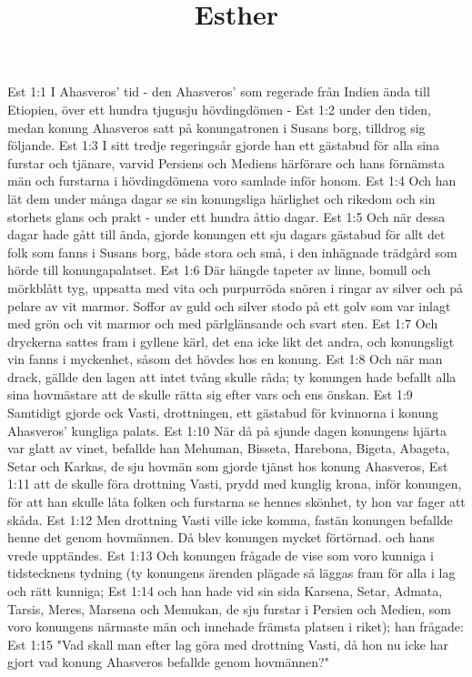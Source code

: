 

\title{Esther}

Est 1:1  I Ahasveros' tid - den Ahasveros' som regerade från Indien ända till Etiopien, över ett hundra tjugusju hövdingdömen -
Est 1:2  under den tiden, medan konung Ahasveros satt på konungatronen i Susans borg, tilldrog sig följande.
Est 1:3  I sitt tredje regeringsår gjorde han ett gästabud för alla sina furstar och tjänare, varvid Persiens och Mediens härförare och hans förnämsta män och furstarna i hövdingdömena voro samlade inför honom.
Est 1:4  Och han lät dem under många dagar se sin konungsliga härlighet och rikedom och sin storhets glans och prakt - under ett hundra åttio dagar.
Est 1:5  Och när dessa dagar hade gått till ända, gjorde konungen ett sju dagars gästabud för allt det folk som fanns i Susans borg, både stora och små, i den inhägnade trädgård som hörde till konungapalatset.
Est 1:6  Där hängde tapeter av linne, bomull och mörkblått tyg, uppsatta med vita och purpurröda snören i ringar av silver och på pelare av vit marmor. Soffor av guld och silver stodo på ett golv som var inlagt med grön och vit marmor och med pärlglänsande och svart sten.
Est 1:7  Och dryckerna sattes fram i gyllene kärl, det ena icke likt det andra, och konungsligt vin fanns i myckenhet, såsom det hövdes hos en konung.
Est 1:8  Och när man drack, gällde den lagen att intet tvång skulle råda; ty konungen hade befallt alla sina hovmästare att de skulle rätta sig efter vars och ens önskan.
Est 1:9  Samtidigt gjorde ock Vasti, drottningen, ett gästabud för kvinnorna i konung Ahasveros' kungliga palats.
Est 1:10  När då på sjunde dagen konungens hjärta var glatt av vinet, befallde han Mehuman, Bisseta, Harebona, Bigeta, Abageta, Setar och Karkas, de sju hovmän som gjorde tjänst hos konung Ahasveros,
Est 1:11  att de skulle föra drottning Vasti, prydd med kunglig krona, inför konungen, för att han skulle låta folken och furstarna se hennes skönhet, ty hon var fager att skåda.
Est 1:12  Men drottning Vasti ville icke komma, fastän konungen befallde henne det genom hovmännen. Då blev konungen mycket förtörnad. och hans vrede upptändes.
Est 1:13  Och konungen frågade de vise som voro kunniga i tidstecknens tydning (ty konungens ärenden plägade så läggas fram för alla i lag och rätt kunniga;
Est 1:14  och han hade vid sin sida Karsena, Setar, Admata, Tarsis, Meres, Marsena och Memukan, de sju furstar i Persien och Medien, som voro konungens närmaste män och innehade främsta platsen i riket); han frågade:
Est 1:15  "Vad skall man efter lag göra med drottning Vasti, då hon nu icke har gjort vad konung Ahasveros befallde genom hovmännen?"
